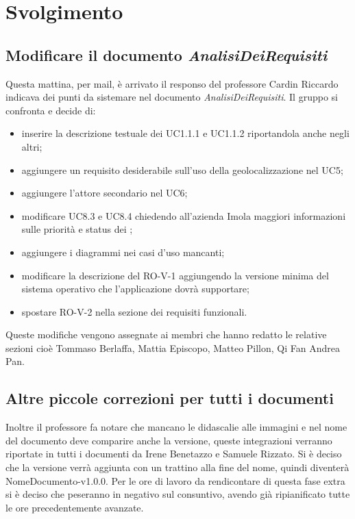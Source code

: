 \section{Svolgimento}
\subsection{Modificare il documento \emph{AnalisiDeiRequisiti}}
Questa mattina, per mail, è arrivato il responso del professore Cardin Riccardo indicava dei punti da sistemare nel documento \emph{AnalisiDeiRequisiti}.
Il gruppo si confronta e decide di:
    \begin{itemize}
        \item inserire la descrizione testuale dei UC1.1.1 e UC1.1.2 riportandola anche negli altri;
        \item aggiungere un requisito desiderabile sull'uso della geolocalizzazione nel UC5;
        \item aggiungere l'attore secondario nel UC6;
        \item modificare UC8.3 e UC8.4 chiedendo all'azienda Imola maggiori informazioni sulle priorità e status dei ;
        \item aggiungere i diagrammi nei casi d'uso mancanti;
        \item modificare la descrizione del RO-V-1 aggiungendo la versione minima del sistema operativo che l'applicazione dovrà supportare;
        \item spostare RO-V-2 nella sezione dei requisiti funzionali.
    \end{itemize}
Queste modifiche vengono assegnate ai membri che hanno redatto le relative sezioni cioè Tommaso Berlaffa, Mattia Episcopo, Matteo Pillon, Qi Fan Andrea Pan. 
\subsection{Altre piccole correzioni per tutti i documenti}
Inoltre il professore fa notare che mancano le didascalie alle immagini e nel nome del documento deve comparire anche la versione, queste integrazioni verranno riportate in tutti i documenti da Irene Benetazzo e Samuele Rizzato.
Si è deciso che la versione verrà aggiunta con un trattino alla fine del nome, quindi diventerà NomeDocumento-v1.0.0.
Per le ore di lavoro da rendicontare di questa fase extra si è deciso che peseranno in negativo sul consuntivo, avendo già ripianificato tutte le ore precedentemente avanzate.